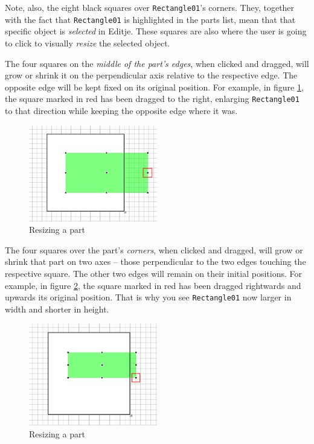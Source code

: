 \documentclass[a4paper]{profusion}
\begin{document}
Note, also, the eight black squares over \texttt{Rectangle01}'s
corners. They, together with the fact that \texttt{Rectangle01} is
highlighted in the parts list, mean that that specific object is
\emph{selected} in Editje. These squares are also where the user is
going to click to visually \emph{resize} the selected object.

The four squares on the \emph{middle of the part's edges}, when
clicked and dragged, will grow or shrink it on the perpendicular axis
relative to the respective edge. The opposite edge will be kept fixed
on its original position. For example, in figure
\ref{fig:rectangle_grow_left}, the square marked in red has been
dragged to the right, enlarging \texttt{Rectangle01} to that direction
while keeping the opposite edge where it was.

\begin{figure}[h!]
  \centering
  \includegraphics[width=0.5\textwidth]{images/rectangle_grow_left.png}
  \caption{Resizing a part}
  \label{fig:rectangle_grow_left}
\end{figure}

The four squares over the part's \emph{corners}, when clicked and
dragged, will grow or shrink that part on two axes -- those
perpendicular to the two edges touching the respective square. The
other two edges will remain on their initial positions. For example,
in figure \ref{fig:rectangle_grow_diagonal}, the square marked in red
has been dragged rightwards and upwards its original position. That is
why you see \texttt{Rectangle01} now larger in width and shorter in
height.

\begin{figure}[h!]
  \centering
  \includegraphics[width=0.5\textwidth]{images/rectangle_grow_diagonal.png}
  \caption{Resizing a part}
  \label{fig:rectangle_grow_diagonal}
\end{figure}
\end{document}
